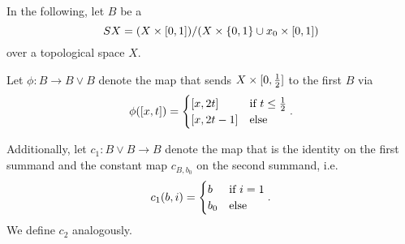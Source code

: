 \begin{myparagraph}
    In the following, let $B$ be a 
    \[ SX = (\cyl{X}) / (X \cross \coll{0, 1} \cup \cyl{x_0})\]
    over a topological space $X$.

    Let $\phi: B \to B \vee B$ denote the map that sends
    $X \cross [0, \half]$ to the first $B$ via
    \[ \phi([x, t]) = \case{[x, 2t]}{[x, 2t - 1]}{t \le \half}. \]

    Additionally, let $c_1: B \vee B \to B$ denote the map
    that is the identity on the first summand
    and the constant map $c_{B, b_0}$ on the second summand, i.e.
    \[ c_1(b, i) = \case{b}{b_0}{i = 1}. \]
    We define $c_2$ analogously.
\end{myparagraph}